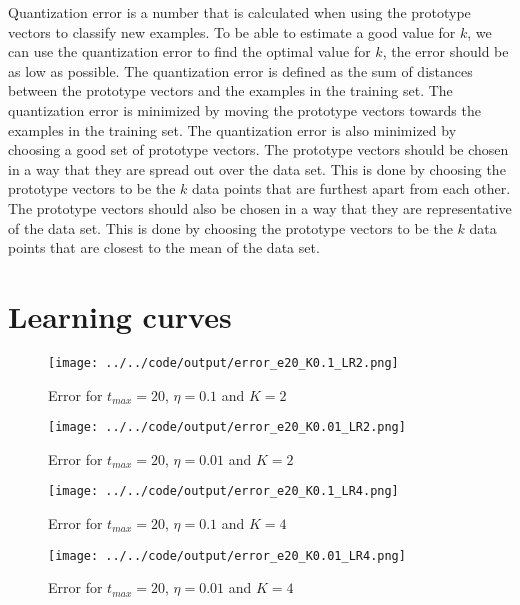 \documentclass[twoside, a4paper, fleqn, reqno]{article}
\begin{document}
Quantization error is a number that is calculated when using the prototype vectors to classify new examples.
To be able to estimate a good value for $k$, we can use the quantization error to find the optimal value for $k$, the error should be as low as possible.
The quantization error is defined as the sum of distances between the prototype vectors and the examples in the training set.
The quantization error is minimized by moving the prototype vectors towards the examples in the training set.
The quantization error is also minimized by choosing a good set of prototype vectors.
The prototype vectors should be chosen in a way that they are spread out over the data set.
This is done by choosing the prototype vectors to be the $k$ data points that are furthest apart from each other.
The prototype vectors should also be chosen in a way that they are representative of the data set.
This is done by choosing the prototype vectors to be the $k$ data points that are closest to the mean of the data set.

\section{Learning curves}

\begin{figure}[H]
	\centering
	\texttt{[image: ../../code/output/error\_e20\_K0.1\_LR2.png]}
	\caption{Error for $t_{max}=20$, $\eta = 0.1$ and $K = 2$}
	\label{fig:error_e20_K0.1_LR2}
\end{figure}

\begin{figure}[H]
	\centering
	\texttt{[image: ../../code/output/error\_e20\_K0.01\_LR2.png]}
	\caption{Error for $t_{max}=20$, $\eta = 0.01$ and $K = 2$}
	\label{fig:error_e20_K0.01_LR2}
\end{figure}

\begin{figure}[H]
	\centering
	\texttt{[image: ../../code/output/error\_e20\_K0.1\_LR4.png]}
	\caption{Error for $t_{max}=20$, $\eta = 0.1$ and $K = 4$}
	\label{fig:error_e20_K0.1_LR4}
\end{figure}

\begin{figure}[H]
	\centering
	\texttt{[image: ../../code/output/error\_e20\_K0.01\_LR4.png]}
	\caption{Error for $t_{max}=20$, $\eta = 0.01$ and $K = 4$}
	\label{fig:error_e20_K0.01_LR4}
\end{figure}
\end{document}
